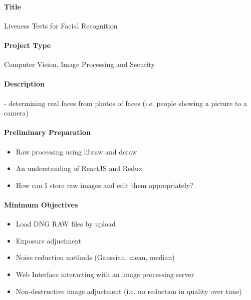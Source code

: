 \documentclass{article}
\begin{document}
    \paragraph{Title}
        Liveness Tests for Facial Recognition
    \paragraph{Project Type}
        Computer Vision, Image Processing and Security
    \paragraph{Description}
        - determining real faces from photos of faces (i.e. people showing a picture to a camera)

    \paragraph{Preliminary Preparation}
        \begin{itemize}
          \item Raw processing using libraw and dcraw
          \item An understanding of ReactJS and Redux
          \item How can I store raw images and edit them appropriately?
        \end{itemize}
    \paragraph{Minimum Objectives}
        \begin{itemize}
          \item Load DNG RAW files by upload
          \item Exposure adjustment
          \item Noise reduction methods (Gaussian, mean, median)
          \item Web Interface interacting with an image processing server
          \item Non-destructive image adjustment (i.e. no reduction in quality over time)
        \end{itemize}
\end{document}
